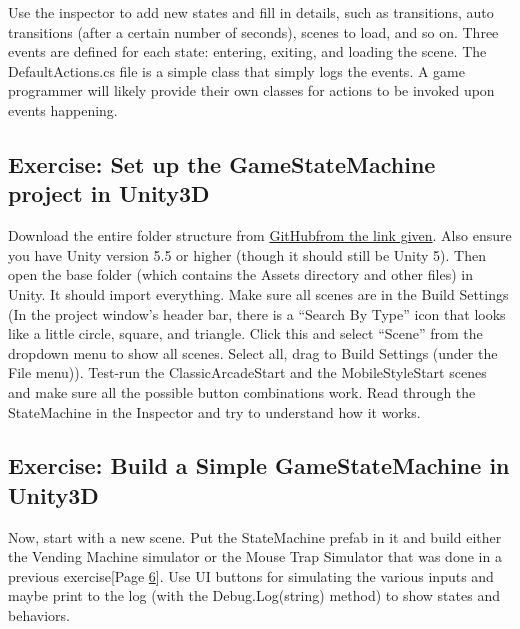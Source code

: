 Use the inspector to add new states and fill in details, such as
transitions, auto transitions (after a certain number of seconds),
scenes to load, and so on. Three events are defined for each state:
entering, exiting, and loading the scene. The DefaultActions.cs file is
a simple class that simply logs the events. A game programmer will
likely provide their own classes for actions to be invoked upon events
happening.

\subsection[Exercise: Set up the GameStateMachine project in
Unity3D]{\texorpdfstring{\protect\hypertarget{anchor-17}{}{}Exercise:
Set up the GameStateMachine project in
Unity3D}{Exercise: Set up the GameStateMachine project in Unity3D}}\label{exercise-set-up-the-gamestatemachine-project-in-unity3d}

Download the entire folder structure from
\href{https://github.com/tdvance/GameStateMachine}{GitHub}\href{https://github.com/tdvance/GameStateMachine}{from
the link given}. Also ensure you have Unity version 5.5 or higher
(though it should still be Unity 5). Then open the base folder (which
contains the Assets directory and other files) in Unity. It should
import everything. Make sure all scenes are in the Build Settings (In
the project window's header bar, there is a ``Search By Type'' icon that
looks like a little circle, square, and triangle. Click this and select
``Scene'' from the dropdown menu to show all scenes. Select all, drag to
Build Settings (under the File menu)). Test-run the ClassicArcadeStart
and the MobileStyleStart scenes and make sure all the possible button
combinations work. Read through the StateMachine in the Inspector and
try to understand how it works.

\subsection[Exercise: Build a Simple GameStateMachine in
Unity3D]{\texorpdfstring{\protect\hypertarget{anchor-18}{}{}Exercise:
Build a Simple GameStateMachine in
Unity3D}{Exercise: Build a Simple GameStateMachine in Unity3D}}\label{exercise-build-a-simple-gamestatemachine-in-unity3d}

Now, start with a new scene. Put the StateMachine prefab in it and build
either the Vending Machine simulator or the Mouse Trap Simulator that
was done in a previous exercise{[}Page
\protect\hyperlink{anchor-5}{6}{]}. Use UI buttons for simulating the
various inputs and maybe print to the log (with the Debug.Log(string)
method) to show states and behaviors.


